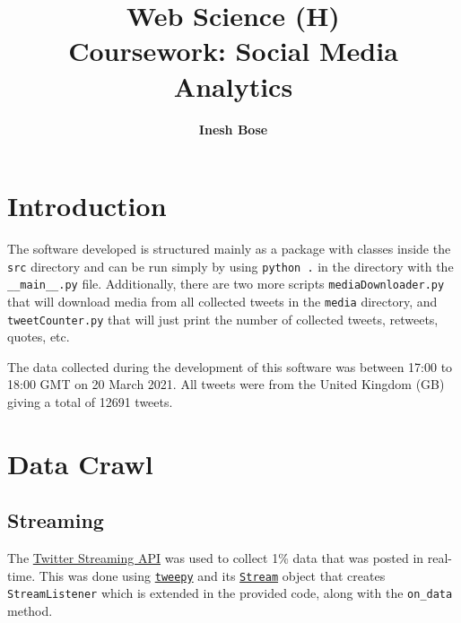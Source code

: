 \documentclass{article}
\title{Web Science (H)\\ \normalsize{\textbf{Coursework:} Social Media Analytics}}
\author{\bf Inesh Bose}
\date{}
\newcommand{\code}[1]{\texttt{#1}}
\begin{document}

\maketitle
\vspace{1cm}

\tableofcontents
{}


\vspace{2cm}

\section{Introduction}

The software developed is structured mainly as a package with classes inside the \code{src} directory and can be run simply by using \code{python .} in the directory with the \code{\_\_main\_\_.py} file. Additionally, there are two more scripts \code{mediaDownloader.py} that will download media from all collected tweets in the \code{media} directory, and \code{tweetCounter.py} that will just print the number of collected tweets, retweets, quotes, etc.

\noindent The data collected during the development of this software was between 17:00 to 18:00 GMT on 20 March 2021. All tweets were from the United Kingdom (GB) giving a total of 12691 tweets.



\newpage

\section{Data Crawl}

\subsection{Streaming}

The \href{https://developer.twitter.com/en/docs/tutorials/consuming-streaming-data}{Twitter Streaming API}\cite{twitterstream} was used to collect 1\% data that was posted in real-time. This was done using \href{https://github.com/tweepy/tweepy}{\code{tweepy}}\cite{tweepy} and its \href{https://github.com/tweepy/tweepy/blob/master/tweepy/streaming.py}{\code{Stream}} object that creates \code{StreamListener} which is extended in the provided code, along with the \code{on\_data} method.
\end{document}
